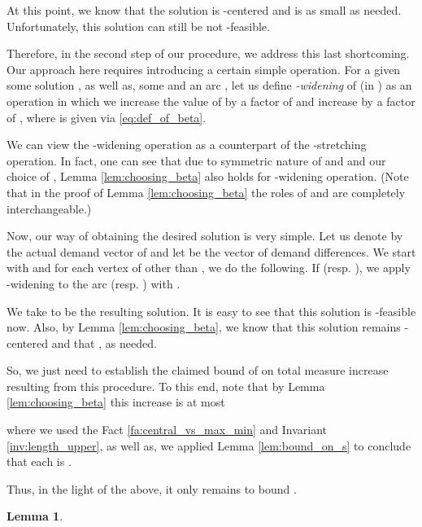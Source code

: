 \documentclass[11pt, letterpaper]{article}
\newtheorem{lemma}[theorem]{Lemma}
\begin{document}
At this point, we know that the solution  is -centered and  is as small as needed. Unfortunately, this solution can still be not -feasible. 

Therefore, in the second step of our procedure, we address this last shortcoming. Our approach here requires introducing a certain simple operation. For a given some solution , as well as, some  and an arc , let us define {\em -widening} of  (in ) as an operation in which we increase the value of  by a factor of  and increase  by a factor of , where  is given via \eqref{eq:def_of_beta}.

We can view the -widening operation as a counterpart of the -stretching operation. In fact, one can see that due to symmetric nature of  and  and our choice of , Lemma \ref{lem:choosing_beta} also holds for -widening operation. (Note that in the proof of Lemma \ref{lem:choosing_beta} the roles of  and  are completely interchangeable.)

Now, our way of obtaining the desired solution  is very simple. Let us denote by  the actual demand vector of  and let  be the vector of demand differences. We start with  and for each vertex  of  other than , we do the following. If  (resp. ), we apply -widening to the arc  (resp. ) with . 

We take  to be the resulting solution. It is easy to see that this solution is -feasible now. Also, by Lemma \ref{lem:choosing_beta}, we know that this solution remains -centered and that , as needed.

So, we just need to establish the claimed bound of  on total measure increase resulting from this procedure. To this end, note that by Lemma \ref{lem:choosing_beta} this increase is at most

where we used the Fact \ref{fa:central_vs_max_min} and Invariant \ref{inv:length_upper}, as well as, we applied Lemma \ref{lem:bound_on_s} to conclude that each  is . 

Thus, in the light of the above, it only remains to bound . 

\begin{lemma}
\label{lem:fixing_value_flow}

\end{lemma}
\end{document}
